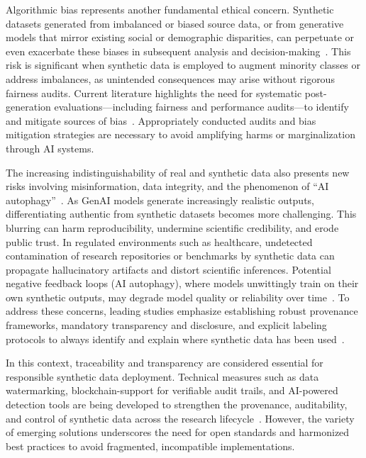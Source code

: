 \documentclass[sigconf]{acmart}
\begin{document}
Algorithmic bias represents another fundamental ethical concern. Synthetic datasets generated from imbalanced or biased source data, or from generative models that mirror existing social or demographic disparities, can perpetuate or even exacerbate these biases in subsequent analysis and decision-making~\cite{ref7}\cite{ref8}\cite{ref14}\cite{ref21}\cite{ref82}. This risk is significant when synthetic data is employed to augment minority classes or address imbalances, as unintended consequences may arise without rigorous fairness audits. Current literature highlights the need for systematic post-generation evaluations—including fairness and performance audits—to identify and mitigate sources of bias~\cite{ref6}\cite{ref7}\cite{ref82}. Appropriately conducted audits and bias mitigation strategies are necessary to avoid amplifying harms or marginalization through AI systems.

The increasing indistinguishability of real and synthetic data also presents new risks involving misinformation, data integrity, and the phenomenon of ``AI autophagy''~\cite{ref5}\cite{ref7}\cite{ref9}\cite{ref21}\cite{ref60}\cite{ref82}. As GenAI models generate increasingly realistic outputs, differentiating authentic from synthetic datasets becomes more challenging. This blurring can harm reproducibility, undermine scientific credibility, and erode public trust. In regulated environments such as healthcare, undetected contamination of research repositories or benchmarks by synthetic data can propagate hallucinatory artifacts and distort scientific inferences. Potential negative feedback loops (AI autophagy), where models unwittingly train on their own synthetic outputs, may degrade model quality or reliability over time~\cite{ref82}. To address these concerns, leading studies emphasize establishing robust provenance frameworks, mandatory transparency and disclosure, and explicit labeling protocols to always identify and explain where synthetic data has been used~\cite{ref5}\cite{ref7}\cite{ref21}\cite{ref88}.

In this context, traceability and transparency are considered essential for responsible synthetic data deployment. Technical measures such as data watermarking, blockchain-support for verifiable audit trails, and AI-powered detection tools are being developed to strengthen the provenance, auditability, and control of synthetic data across the research lifecycle~\cite{ref5}\cite{ref7}\cite{ref21}\cite{ref60}. However, the variety of emerging solutions underscores the need for open standards and harmonized best practices to avoid fragmented, incompatible implementations.
\end{document}
